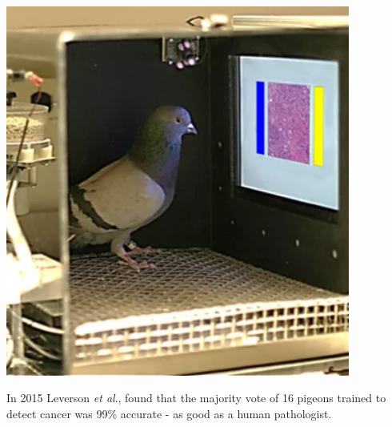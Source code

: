 \begin{frame}
\begin{columns}[T]
\begin{column}{0.48\textwidth}
\begin{center}
    \includegraphics[width=0.85\textwidth]{./images/pigeon}

    \footnotesize{In 2015 Leverson \textit{et al}., found that the majority vote of 16 pigeons trained to detect cancer was 99\% accurate - as good as a human pathologist.}
    
    \end{center}
    \end{column}
\end{columns}

\end{frame}
